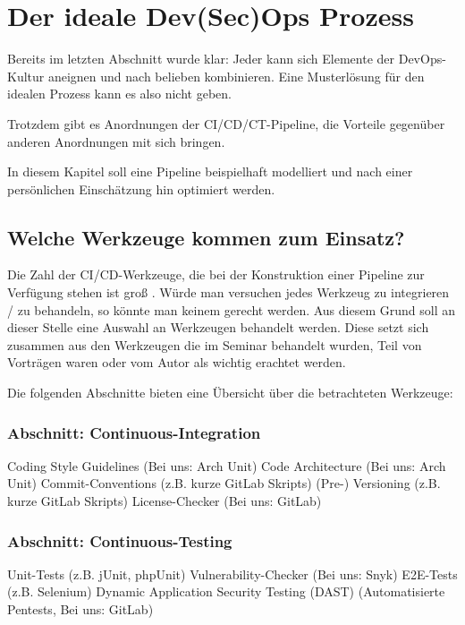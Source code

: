 \chapter{Der \glqq ideale\grqq{} Dev(Sec)Ops Prozess}

Bereits im letzten Abschnitt wurde klar: Jeder kann sich Elemente der DevOps-Kultur aneignen und nach belieben kombinieren. 
Eine \glqq Musterlösung\grqq{} für den idealen Prozess kann es also nicht geben. 

Trotzdem gibt es Anordnungen der CI/CD/CT-Pipeline, die Vorteile gegenüber anderen Anordnungen mit sich bringen. 

In diesem Kapitel soll eine Pipeline beispielhaft modelliert und nach einer persönlichen Einschätzung hin optimiert werden.

\section{Welche Werkzeuge kommen zum Einsatz?}

Die Zahl der CI/CD-Werkzeuge, die bei der Konstruktion einer Pipeline zur Verfügung stehen ist groß \cite{xebialabsXebiaLabsPrasentiertPeriodensystem2018} \cite{digital.aiPeriodicTableDevOps}. Würde man versuchen jedes Werkzeug zu integrieren / zu behandeln, so könnte man keinem gerecht werden.
Aus diesem Grund soll an dieser Stelle eine Auswahl an Werkzeugen behandelt werden. Diese setzt sich zusammen aus den Werkzeugen die im Seminar behandelt wurden, Teil von Vorträgen waren oder vom Autor als wichtig erachtet werden.

Die folgenden Abschnitte bieten eine Übersicht über die betrachteten Werkzeuge:

\subsection{Abschnitt: Continuous-Integration}
Coding Style Guidelines (Bei uns: Arch Unit)
Code Architecture (Bei uns: Arch Unit)
Commit-Conventions (z.B. kurze GitLab Skripts)
(Pre-) Versioning (z.B. kurze GitLab Skripts)
License-Checker (Bei uns: GitLab)

\subsection{Abschnitt: Continuous-Testing}
Unit-Tests (z.B. jUnit, phpUnit)
Vulnerability-Checker (Bei uns: Snyk)
E2E-Tests (z.B. Selenium)
Dynamic Application Security Testing (DAST) (Automatisierte Pentests, Bei uns: GitLab)

